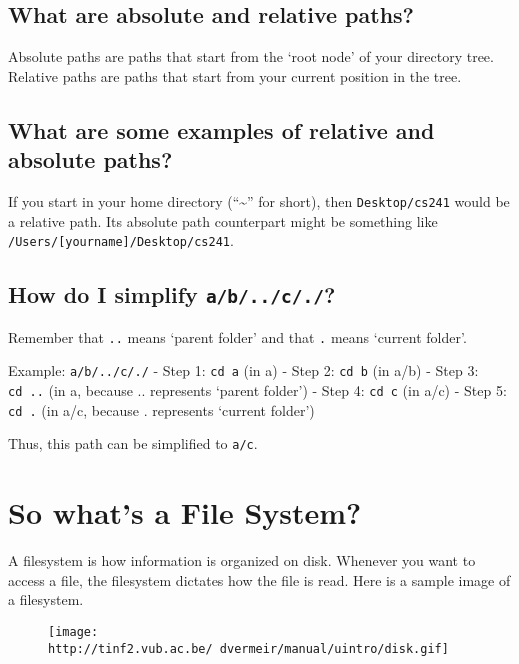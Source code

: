 \subsection{What are absolute and relative
paths?}\label{what-are-absolute-and-relative-paths}

Absolute paths are paths that start from the `root node' of your
directory tree. Relative paths are paths that start from your current
position in the tree.

\subsection{What are some examples of relative and absolute
paths?}\label{what-are-some-examples-of-relative-and-absolute-paths}

If you start in your home directory (``\textasciitilde{}'' for short),
then \texttt{Desktop/cs241} would be a relative path. Its absolute path
counterpart might be something like
\texttt{/Users/{[}yourname{]}/Desktop/cs241}.

\subsection{\texorpdfstring{How do I simplify
\texttt{a/b/../c/./}?}{How do I simplify a/b/../c/./?}}\label{how-do-i-simplify-ab..c.}

Remember that \texttt{..} means `parent folder' and that \texttt{.}
means `current folder'.

Example: \texttt{a/b/../c/./} - Step 1: \texttt{cd\ a} (in a) - Step 2:
\texttt{cd\ b} (in a/b) - Step 3: \texttt{cd\ ..} (in a, because ..
represents `parent folder') - Step 4: \texttt{cd\ c} (in a/c) - Step 5:
\texttt{cd\ .} (in a/c, because . represents `current folder')

Thus, this path can be simplified to \texttt{a/c}.

\section{So what's a File System?}\label{so-whats-a-file-system}

A filesystem is how information is organized on disk. Whenever you want
to access a file, the filesystem dictates how the file is read. Here is
a sample image of a filesystem.

\begin{figure}[htbp]
\centering
\texttt{[image: http://tinf2.vub.ac.be/~dvermeir/manual/uintro/disk.gif]}
\caption{}
\end{figure}

